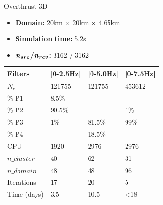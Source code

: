 
\begin{frame}{Overthrust 3D}

  \vspace{-0.6cm}
   \begin{multicols}{2}

     \begin{itemize}
       \scriptsize
    \item \textbf{Domain:} 20km $\times$ 20km $\times$ 4.65km
    \item \textbf{Simulation time:} 5.2s
    \item \textbf{$\boldsymbol{{n_{src}}}$/$\boldsymbol{{n_{rcv}}}$:} 3162 / 3162
    \end{itemize}

     \begin{table}[]
       \scriptsize
\begin{tabular}{|l|l|l|l|}
\hline
Filters      & {[}0-2.5Hz{]} & {[}0-5.0Hz{]} & {[}0-7.5Hz{]} \\ \hline
$N_e$        & 121755        & 121755        & 453612        \\ \hline
\% P1        & 8.5\%         &               &               \\ \hline
\% P2        & 90.5\%        &               & 1\%           \\ \hline
\% P3        & 1\%           & 81.5\%        & 99\%          \\ \hline
\% P4        &               & 18.5\%        &               \\ \hline
\rowcolor{red!30}
CPU          & 1920          & 2976          & 2976          \\ \hline
$n\_cluster$ & 40            & 62            & 31            \\ \hline
$n\_domain$  & 48            & 48            & 96            \\ \hline
Iterations   & 17            & 20            & 5             \\ \hline
\rowcolor{red!30}
Time (days) & 3.5      & 10.5     & <18     \\ \hline
\end{tabular}
\end{table}


\end{multicols}
\end{frame}
